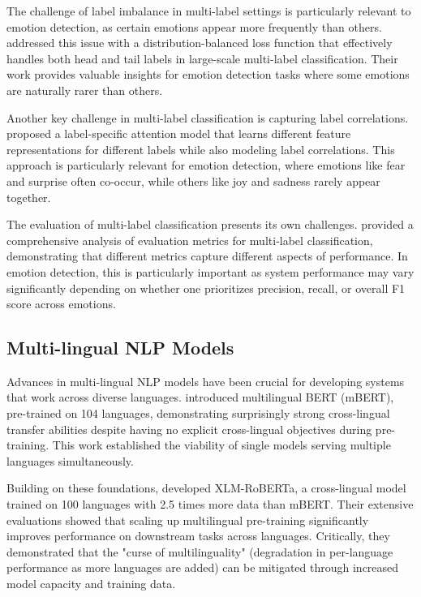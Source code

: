 \documentclass[a4paper,12pt]{extarticle}
\begin{document}
The challenge of label imbalance in multi-label settings is particularly relevant to emotion detection, as certain emotions appear more frequently than others. \cite{wu2020distribution} addressed this issue with a distribution-balanced loss function that effectively handles both head and tail labels in large-scale multi-label classification. Their work provides valuable insights for emotion detection tasks where some emotions are naturally rarer than others.

Another key challenge in multi-label classification is capturing label correlations. \cite{yeh2017learning} proposed a label-specific attention model that learns different feature representations for different labels while also modeling label correlations. This approach is particularly relevant for emotion detection, where emotions like fear and surprise often co-occur, while others like joy and sadness rarely appear together.

The evaluation of multi-label classification presents its own challenges. \cite{sorower2010literature} provided a comprehensive analysis of evaluation metrics for multi-label classification, demonstrating that different metrics capture different aspects of performance. In emotion detection, this is particularly important as system performance may vary significantly depending on whether one prioritizes precision, recall, or overall F1 score across emotions.

\subsection{Multi-lingual NLP Models}

Advances in multi-lingual NLP models have been crucial for developing systems that work across diverse languages. \cite{devlin2019bert} introduced multilingual BERT (mBERT), pre-trained on 104 languages, demonstrating surprisingly strong cross-lingual transfer abilities despite having no explicit cross-lingual objectives during pre-training. This work established the viability of single models serving multiple languages simultaneously.

Building on these foundations, \cite{conneau2020unsupervised} developed XLM-RoBERTa, a cross-lingual model trained on 100 languages with 2.5 times more data than mBERT. Their extensive evaluations showed that scaling up multilingual pre-training significantly improves performance on downstream tasks across languages. Critically, they demonstrated that the "curse of multilinguality" (degradation in per-language performance as more languages are added) can be mitigated through increased model capacity and training data.
\end{document}
